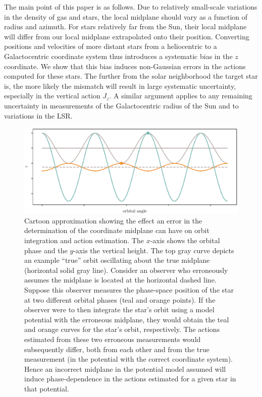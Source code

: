 \documentclass[twocolumn]{aastex62}
\begin{document}
The main point of this paper is as follows. Due to relatively small-scale
variations in the density of gas and stars, the local midplane should vary as a
function of radius and azimuth. For stars relatively far from the Sun, their
local midplane will differ from our local midplane extrapolated onto their
position. Converting positions and velocities of more distant stars from a
heliocentric to a Galactocentric coordinate system thus introduces a systematic
bias in the $z$ coordinate. We show that this bias induces non-Gaussian errors
in the actions computed for these stars. The further from the solar neighborhood
the target star is, the more likely the mismatch will result in large systematic
uncertainty, especially in the vertical action $J_z$. A similar argument applies
to any remaining uncertainty in measurements of the Galactocentric radius of the
Sun and to variations in the LSR.

\begin{figure}[ht!]
\begin{center}
\includegraphics[width=\textwidth]{fig/cartoon.pdf}
\end{center}
\caption{Cartoon approximation showing the effect an error in the determination
of the coordinate midplane can have on orbit integration and action estimation.
The $x$-axis shows the orbital phase and the $y$-axis the vertical height. The
top gray curve depicts an example ``true'' orbit oscillating about the true
midplane (horizontal solid gray line). Consider an observer who erroneously
assumes the midplane is located at the horizontal dashed line. Suppose this
observer measures the phase-space position of the star at two different orbital
phases (teal and orange points). If the observer were to then integrate the
star's orbit using a model potential with the erroneous midplane, they would
obtain the teal and orange curves for the star's orbit, respectively. The
actions estimated from these two erroneous measurements would subsequently
differ, both from each other and from the true measurement (in the potential
with the correct coordinate system). Hence an incorrect midplane in the
potential model assumed will induce phase-dependence in the actions estimated
for a given star in that potential.} \label{fig:cartoon} \end{figure}
\end{document}
